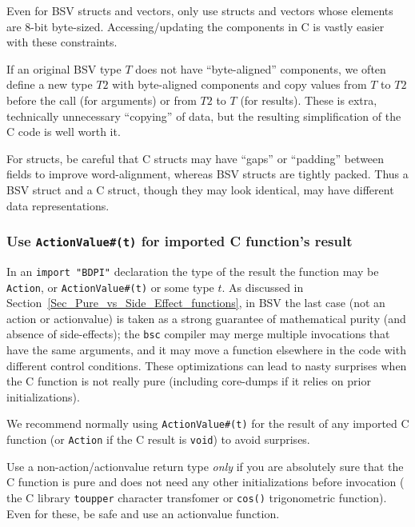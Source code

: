 Even for BSV structs and vectors, only use structs and vectors whose
elements are 8-bit byte-sized.  Accessing/updating the components in C
is vastly easier with these constraints.

If an original BSV type $T$ does not have ``byte-aligned'' components,
we often define a new type $T2$ with byte-aligned components and copy
values from $T$ to $T2$ before the call (for arguments) or from $T2$
to $T$ (for results).  These is extra, technically unnecessary
``copying'' of data, but the resulting simplification of the C code is
well worth it.

For structs, be careful that C structs may have ``gaps'' or
``padding'' between fields to improve word-alignment, whereas BSV
structs are tightly packed.  Thus a BSV struct and a C struct, though
they may look identical, may have different data representations.


\subsubsection{Use {\tt ActionValue\#(t)} for imported C function's result}

In an \verb|import "BDPI"| declaration the type of the result the
function may be \verb|Action|, or \verb|ActionValue#(t)| or some type
$t$.  As discussed in Section~\ref{Sec_Pure_vs_Side_Effect_functions},
in BSV the last case (not an action or actionvalue) is taken as a
strong guarantee of mathematical purity (and absence of side-effects);
the \verb|bsc| compiler may merge multiple invocations that have the
same arguments, and it may move a function elsewhere in the code with
different control conditions.  These optimizations can lead to nasty
surprises when the C function is not really pure (including core-dumps
if it relies on prior initializations).

We recommend normally using \verb|ActionValue#(t)| for the result of
any imported C function (or \verb|Action| if the C result is
\verb|void|) to avoid surprises.

Use a non-action/actionvalue return type \emph{only} if you are
absolutely sure that the C function is pure and does not need any
other initializations before invocation ({\eg} the C library
\verb|toupper| character transfomer or \verb|cos()| trigonometric
function).  Even for these, be safe and use an actionvalue function.


